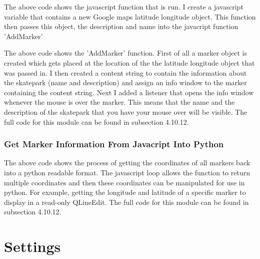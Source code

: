 \begin{landscape}

The above code shows the javascript function that is run. I create a javascript variable that contains a new Google maps latitude longitude object. This function then passes this object, the description and name into the javacript function 'AddMarker'




The above code shows the 'AddMarker' function. First of all a marker object is created which gets placed at the location of the the latitude longitude object that was passed in. I then created a content string to contain the information about the skatepark (name and description) and assign an info window to the marker containing the content string. Next I added a listener that opens the info window whenever the mouse is over the marker. This means that the name and the description of the skatepark that you have your mouse over will be visible.  The full code for this module can be found in subsection 4.10.12.

\subsubsection{Get Marker Information From Javacript Into Python}


The above code shows the process of getting the coordinates of all markers back into a python readable format. The javascript loop allows the function to return multiple coordinates and then these coordinates can be manipulated for use in python. For example, getting the longitude and latitude of a specific marker to display in a read-only QLineEdit. The full code for this module can be found in subsection 4.10.12.



\end{landscape}










\section{Settings}

